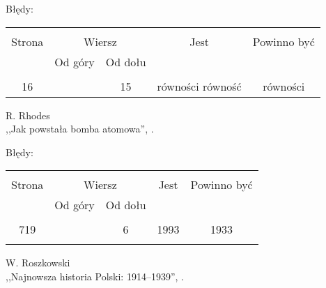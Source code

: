 \documentclass[a4paper,11pt]{article}
\newcommand{\Str}[1]{\textbf{Str. #1.}}
\begin{document}

Błędy:\\
\begin{center}
  \begin{tabular}{|c|c|c|c|c|}
    \hline
    & \multicolumn{2}{c|}{} & & \\
    Strona & \multicolumn{2}{c|}{Wiersz}& Jest & Powinno być \\ \cline{2-3}
    & Od góry & Od dołu &  &  \\ \hline
    & & & & \\
    16 & & 15 & równości równość & równości \\ \hline
  \end{tabular}
\end{center}



\begin{center}
  R. Rhodes \\
  ,,Jak powstała bomba atomowa'', \cite{Rho00}.
\end{center}

Błędy:\\
\begin{center}
  \begin{tabular}{|c|c|c|c|c|}
    \hline
    & \multicolumn{2}{c|}{} & & \\
    Strona & \multicolumn{2}{c|}{Wiersz}& Jest & Powinno być \\ \cline{2-3}
    & Od góry & Od dołu &  &  \\ \hline
    & & & & \\
    719 & & 6 & 1993 & 1933 \\
    & & & & \\ \hline
  \end{tabular}
\end{center}

\begin{center}
  W. Roszkowski \\
  ,,Najnowsza historia Polski: 1914--1939'', \cite{Ros11a}.
\end{center}
\end{document}
